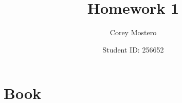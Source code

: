 \documentclass{article}
\title{Homework 1}
\author{Corey Mostero}
\date{Student ID: 256652}
\begin{document}
\newcommand{\hr}{\par\noindent\rule{\textwidth}{0.4pt}}

\newcommand{\bc}[1]{
	\begin{equation*}
		\begin{boxed}
			{#1}
		\end{boxed}
	\end{equation*}
}

\maketitle
\newpage

\tableofcontents

\section{Book}
\end{document}
